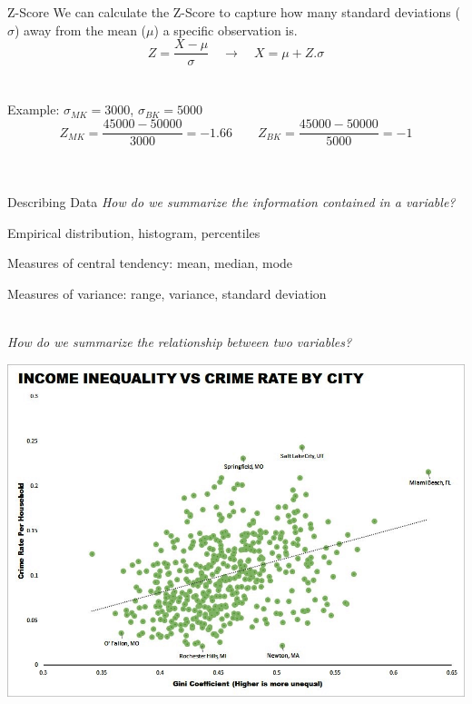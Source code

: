 \documentclass{./../div_teaching_slides}
\begin{document}
\begin{frame}{Z-Score}
We can calculate the Z-Score to capture how many standard deviations ($\sigma$) away from the mean ($\mu$) a specific observation is. \\
$$ Z = \frac{X - \mu}{\sigma} \quad \rightarrow \quad X = \mu + Z.\sigma $$ \\~\\
Example: $\sigma_{MK} = 3000$, $\sigma_{BK} = 5000$ \\
 $$Z_{MK} = \frac{45000 - 50000}{3000} = -1.66 \quad \quad Z_{BK} = \frac{45000 - 50000}{5000} = -1$$ \\~\\
\end{frame}

\begin{frame}{Describing Data}
\textit{How do we summarize the information contained in a variable?} \\
\begin{witemize}
\item Empirical distribution, histogram, percentiles 
\item Measures of central tendency: mean, median, mode
\item Measures of variance: range, variance, standard deviation \\~\\
\end{witemize}
\textit{How do we summarize the relationship between two variables?} \\
\end{frame}


\begin{frame}{}
\centering
\includegraphics[scale=0.625]{crime}
\end{frame}
\end{document}
